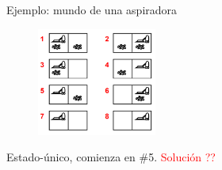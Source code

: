 \begin{frame}{Ejemplo: mundo de una aspiradora}
\begin{figure} %
    \centering
    \includegraphics[width=0.35\textwidth]{8_image_example1.PNG}
        \end{figure}

    Estado-único, comienza en \#5. \textcolor{red}{Solución ??}
      

    
\end{frame}